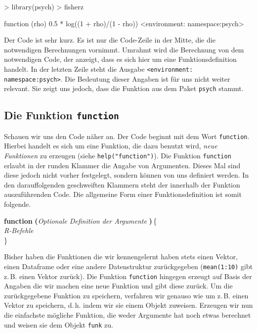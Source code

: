 \documentclass[12pt, a4paper,twoside,openany,x11names,svgnames]{memoir}
\begin{document}
\begin{Schunk}
\begin{Sinput}
> library(psych)
> fisherz
\end{Sinput}
\begin{Soutput}
function (rho) 
{
    0.5 * log((1 + rho)/(1 - rho))
}
<environment: namespace:psych>
\end{Soutput}
\end{Schunk}

Der Code ist sehr kurz. Es ist nur die Code-Zeile in der Mitte, die die notwendigen Berechnungen vornimmt. Umrahmt wird die Berechnung von dem notwendigen Code, der \R{} anzeigt, dass es sich hier um eine Funktionsdefinition handelt. In der letzten Zeile steht die Ausgabe \texttt{<environment: namespace:psych>}. Die Bedeutung dieser Angaben ist für uns nicht weiter relevant. Sie zeigt uns jedoch, dass die Funktion aus dem Paket \texttt{psych} stammt.


\subsection{Die Funktion \texttt{function}}

Schauen wir uns den Code näher an. Der Code beginnt mit dem Wort \texttt{function}. Hierbei handelt es sich um eine \R{} Funktion, die dazu benutzt wird, \emph{neue Funktionen} zu erzeugen (siehe \texttt{help("function")}). Die Funktion \texttt{function} erlaubt in der runden Klammer die Angabe von Argumenten. Dieses Mal sind diese jedoch nicht vorher festgelegt, sondern können von uns definiert werden. In den darauffolgenden geschweiften Klammern steht der innerhalb der Funktion auszuführenden \R{} Code. Die allgemeine Form einer Funktionsdefinition ist somit folgende.

\vspace{3mm}
\begin{onehalfspace} 
\hspace*{30mm}  \textbf{function} \textbf{(}\emph{Optionale Definition der Argumente} \textbf{)}\,\{  \\
\hspace*{35mm}  \emph{R-Befehle} \\
\hspace*{30mm}  \} 
\end{onehalfspace} 
\vspace{3mm}   

Bisher haben die Funktionen die wir kennengelernt haben stets einen Vektor, einen Dataframe oder eine andere Datenstruktur zurückgegeben (\texttt{mean(1:10)} gibt z.\,B. einen Vektor zurück). Die Funktion \texttt{function} hingegen erzeugt auf Basis der Angaben die wir machen eine neue Funktion und gibt diese zurück. Um die zurückgegebene Funktion zu speichern, verfahren wir genauso wie um z.\,B. einen Vektor zu speichern, d.\,h. indem wir sie einem Objekt zuweisen. Erzeugen wir nun die einfachste mögliche Funktion, die weder Argumente hat noch etwas berechnet und weisen sie dem Objekt \texttt{funk} zu.
\end{document}
